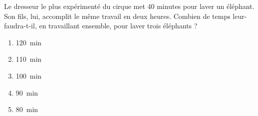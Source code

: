 Le dresseur le plus expérimenté du cirque met 40 minutes pour laver un éléphant. Son fils, lui, accomplit le même travail en deux heures. Combien de temps leur-faudra-t-il, en travaillant ensemble, pour laver trois éléphants ?
\begin{multicols}{5}
  \begin{enumerate}[A/]
  \item 120~min
  \item 110~min
  \item 100~min
  \item 90~min
  \item 80~min
  \end{enumerate}
\end{multicols}